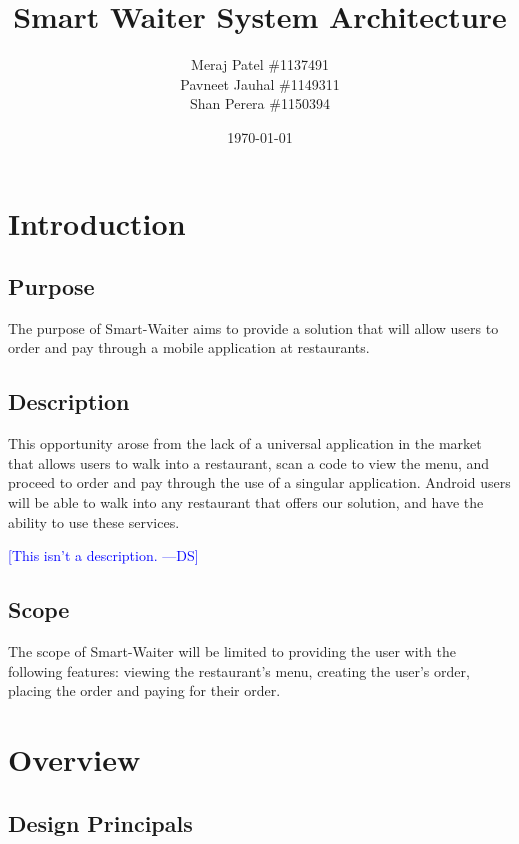 \documentclass[12pt, titlepage]{article}
\newcommand{\authornote}[3]{\textcolor{#1}{[#3 ---#2]}}
\newcommand{\authornote}[3]{}
\newcommand{\ds}[1]{\authornote{blue}{DS}{#1}}
\begin{document}
\title{Smart Waiter System Architecture} 
\author{Meraj Patel \#1137491 \\ Pavneet Jauhal \#1149311\\ Shan Perera \#1150394}
\date{\today}
\maketitle

\tableofcontents 

\listoffigures

\listoftables

\section{Introduction}

\subsection{Purpose}
The purpose of Smart-Waiter aims to provide a solution that will allow users to order and pay through a mobile application at restaurants.

\subsection{Description}
This opportunity arose from the lack of a universal application in the market that allows users to walk into a restaurant, scan a code to view the menu, and proceed to order and pay through the use of a singular application. Android users will be able to walk into any restaurant that offers our solution, and have the ability to use these services.

\ds{This isn't a description.}

\subsection{Scope}
The scope of Smart-Waiter will be limited to providing the user with the following features: viewing the restaurant's menu, creating the user's order, placing the order and paying for their order. 

\section{Overview}

\subsection{Design Principals}
\end{document}

